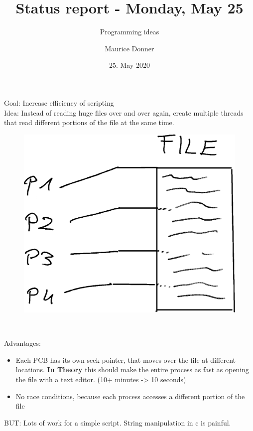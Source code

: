 \documentclass{beamer}
\title{\texorpdfstring{\color{blue!50!black}\textbf{Status report - Monday, May 25}}{}}
\subtitle{Programming ideas}
\author{Maurice Donner}
\date{25. May 2020}
\begin{document}
\maketitle

\begin{frame}
\LARGE{Goal:} \normalsize Increase efficiency of scripting\\[0.5cm] \pause
\LARGE{Idea:} \normalsize Instead of reading huge files over and over again,
create multiple threads that read different portions of the file at the same
time.\\[0.5cm]
\begin{minipage}{.3\textwidth}
\begin{figure}[]
    \includegraphics[width=\textwidth]{image.png}
\end{figure}
\end{minipage}
\begin{minipage}{0.05\textwidth}
\ 
\end{minipage}
\pause
\begin{minipage}{0.6\textwidth}
    Advantages: 
    \begin{itemize}
	\item Each PCB has its own seek pointer, that moves over the file
    at different locations. \textbf{In Theory} this should make the entire
    process as fast as opening the file with a text editor. (10+ minutes ->
    10 seconds)
    \item No race conditions, because each process accesses a different portion
    of the file\\[.5cm]
\end{itemize}
\end{minipage}
\pause
BUT: Lots of work for a simple script. String manipulation in c is painful.
\end{frame}
\end{document}
